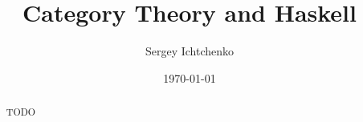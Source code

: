\documentclass[english, twoside]{HYthesis}
\title{Category Theory and Haskell}
\author{Sergey Ichtchenko}
\date{\today}
\theoremstyle{definition}
\theoremstyle{plain}
\begin{document}
\maketitle

\begin{abstract}
TODO
\end{abstract}

\mytableofcontents



\clearpage
{} %

\end{document}
